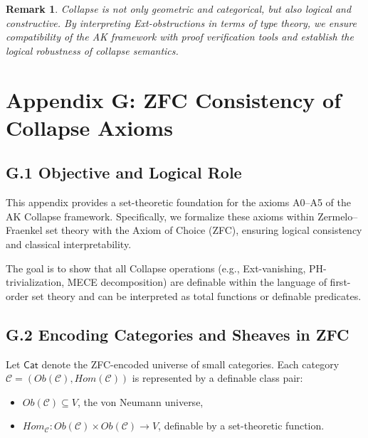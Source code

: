\documentclass[11pt]{article}
\newtheorem{remark}[theorem]{Remark}
\begin{document}
\begin{remark}
Collapse is not only geometric and categorical,  
but also logical and constructive.  
By interpreting Ext-obstructions in terms of type theory,  
we ensure compatibility of the AK framework with proof verification tools  
and establish the logical robustness of collapse semantics.
\end{remark}



\section*{Appendix G: ZFC Consistency of Collapse Axioms}

\subsection*{G.1 Objective and Logical Role}

This appendix provides a set-theoretic foundation for the axioms A0–A5 of the AK Collapse framework.  
Specifically, we formalize these axioms within Zermelo–Fraenkel set theory with the Axiom of Choice (ZFC),  
ensuring logical consistency and classical interpretability.

The goal is to show that all Collapse operations (e.g., Ext-vanishing, PH-trivialization, MECE decomposition)  
are definable within the language of first-order set theory and can be interpreted as total functions or definable predicates.

\subsection*{G.2 Encoding Categories and Sheaves in ZFC}

Let \( \mathsf{Cat} \) denote the ZFC-encoded universe of small categories.  
Each category \( \mathcal{C} = (Ob(\mathcal{C}), Hom(\mathcal{C})) \) is represented by a definable class pair:

\begin{itemize}
  \item \( Ob(\mathcal{C}) \subseteq V \), the von Neumann universe,
  \item \( Hom_{\mathcal{C}} : Ob(\mathcal{C}) \times Ob(\mathcal{C}) \to V \), definable by a set-theoretic function.
\end{itemize}
\end{document}
